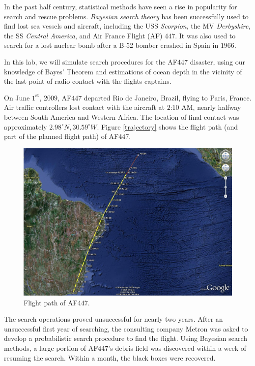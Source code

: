 
In the past half century, statistical methods have seen a rise in popularity for search and rescue problems. \emph{Bayesian search theory} has been successfully used to find lost sea vessels and aircraft, including the USS \emph{Scorpion}, the MV \emph{Derbyshire}, the SS \emph{Central America}, and Air France Flight (AF) $447$. It was also used to search for a lost nuclear bomb after a B-52 bomber crashed in Spain in $1966$.

In this lab, we will simulate search procedures for the AF$447$ disaster, using our knowledge of Bayes' Theorem and estimations of ocean depth in the vicinity of the last point of radio contact with the flights captains.

On June $1^{\text{st}}$, $2009$, AF$447$ departed Rio de Janeiro, Brazil, flying to Paris, France. Air traffic controllers lost contact with the aircraft at $2$:$10$ AM, nearly halfway between South America and Western Africa. The location of final contact was approximately $2.98^{\circ} N, 30.59^{\circ} W$. Figure \ref{trajectory} shows the flight path (and part of the planned flight path) of AF$447$.

\begin{figure}[h]
\centering
\includegraphics[width=\textwidth]{trajectory.jpg}
\caption{Flight path of AF$447$.}
\label{fig:trajectory}
\end{figure}

The search operations proved unsuccessful for nearly two years. After an unsuccessful first year of searching, the consulting company Metron was asked to develop a probabilistic search procedure to find the flight. Using Bayesian search methods, a large portion of AF$447$'s debris field was discovered within a week of resuming the search. Within a month, the black boxes were recovered.

